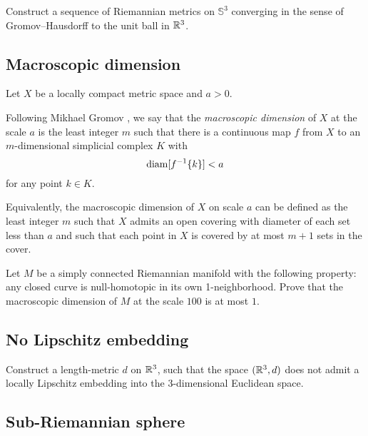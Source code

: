 \begin{pr}
Construct a sequence of Riemannian metrics on $\mathbb{S}^3$ converging in the sense of Gromov--Hausdorff 
to the unit ball in $\mathbb{R}^3$.
\end{pr}

\subsection*{Macroscopic dimension\easy}
\label{macroscopic dimension} 

Let $X$ be a locally compact metric space
and $a>0$.

Following Mikhael Gromov \cite[see][]{gromov:macroscopic-dimension},
we say that the \emph{macroscopic dimension}  of $X$ at the scale $a$ is the least integer $m$ such that there is a continuous map $f$ from $X$ to an $m$-dimensional simplicial complex $K$
with 
\[\operatorname{\rm diam}\nolimits[f^{-1}\{k\}]<a\]
for any point $k\in K$.

Equivalently, the macroscopic dimension of $X$ on scale $a$ can be defined as 
the least integer $m$ such that $X$ admits an open covering with diameter of each set less than $a$ 
and such that each point in $X$ is covered by at most $m+1$ sets in the cover.

\begin{pr}
Let $M$ be a simply connected Riemannian manifold with the following property: 
any closed curve is null-homotopic 
in its own  1-neighborhood. 
Prove that the macroscopic dimension of $M$ at the scale $100$ is at most $1$.
\end{pr}

\subsection*{No Lipschitz embedding\hard}
\label{weird-metric} 

\begin{pr}
Construct a length-metric $d$ on $\mathbb{R}^3$,
such that 
the space $(\mathbb{R}^3,d)$ does not admit a locally Lipschitz embedding into the 3-dimensional Euclidean space.
\end{pr}

\subsection*{Sub-Riemannian sphere\thm}
\label{sub-Riemannian} 

